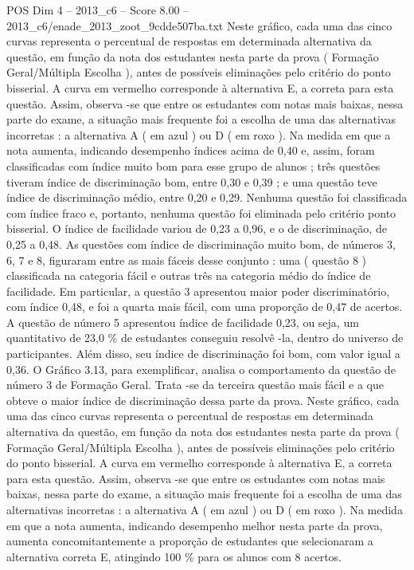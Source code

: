 \begin{textsample}{POS Dim 4 – 2013\_c6 – Score 8.00 – 2013\_c6/enade\_2013\_zoot\_9cdde507ba.txt}
Neste gráfico, cada uma das cinco curvas representa o percentual de respostas em determinada alternativa da questão, em função da nota dos estudantes nesta parte da prova ( Formação Geral/Múltipla Escolha ), antes de possíveis eliminações pelo critério do ponto bisserial.
A curva em vermelho corresponde à alternativa E, a correta para esta questão.
Assim, observa -se que entre os estudantes com notas mais baixas, nessa parte do exame, a situação mais frequente foi a escolha de uma das alternativas incorretas : a alternativa A ( em azul ) ou D ( em roxo ).
Na medida em que a nota aumenta, indicando desempenho índices acima de 0,40 e, assim, foram classificadas com índice muito bom para esse grupo de alunos ; três questões tiveram índice de discriminação bom, entre 0,30 e 0,39 ; e uma questão teve índice de discriminação médio, entre 0,20 e 0,29.
Nenhuma questão foi classificada com índice fraco e, portanto, nenhuma questão foi eliminada pelo critério ponto bisserial.
O índice de facilidade variou de 0,23 a 0,96, e o de discriminação, de 0,25 a 0,48.
As questões com índice de discriminação muito bom, de números 3, 6, 7 e 8, figuraram entre as mais fáceis desse conjunto : uma ( questão 8 ) classificada na categoria fácil e outras três na categoria médio do índice de facilidade.
Em particular, a questão 3 apresentou maior poder discriminatório, com índice 0,48, e foi a quarta mais fácil, com uma proporção de 0,47 de acertos.
A questão de número 5 apresentou índice de facilidade 0,23, ou seja, um quantitativo de 23,0 \% de estudantes conseguiu resolvê -la, dentro do universo de participantes.
Além disso, seu índice de discriminação foi bom, com valor igual a 0,36.
O Gráfico 3.13, para exemplificar, analisa o comportamento da questão de número 3 de Formação Geral.
Trata -se da terceira questão mais fácil e a que obteve o maior índice de discriminação dessa parte da prova.
Neste gráfico, cada uma das cinco curvas representa o percentual de respostas em determinada alternativa da questão, em função da nota dos estudantes nesta parte da prova ( Formação Geral/Múltipla Escolha ), antes de possíveis eliminações pelo critério do ponto bisserial.
A curva em vermelho corresponde à alternativa E, a correta para esta questão.
Assim, observa -se que entre os estudantes com notas mais baixas, nessa parte do exame, a situação mais frequente foi a escolha de uma das alternativas incorretas : a alternativa A ( em azul ) ou D ( em roxo ).
Na medida em que a nota aumenta, indicando desempenho melhor nesta parte da prova, aumenta concomitantemente a proporção de estudantes que selecionaram a alternativa correta E, atingindo 100 \% para os alunos com 8 acertos.

\end{textsample}
